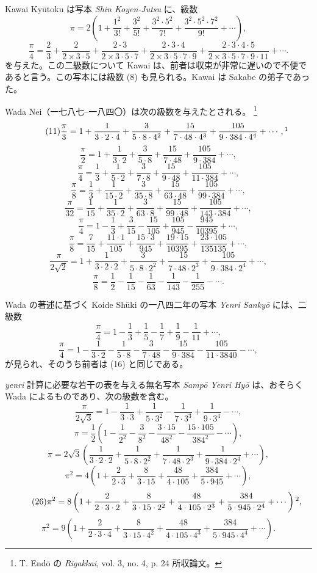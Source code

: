 \documentclass[11pt]{article}
\newcommand{\scanpage}[2]{\clearpage\setcounter{footnote}{0}\noindent{\footnotesize\color{gray}PDF #1 頁 · #2}\par\medskip}
\newcommand{\scanfooter}{}
\newcommand{\dd}{\mathbin{\cdot}}
\begin{document}
Kawai Kyūtoku は写本 \emph{Shin Koyen-Jutsu} に、級数
\[
\tag{9}\pi=2\left(1+\frac{1^2}{3!}+\frac{3^2}{5!}+\frac{3^2\dd5^2}{7!}+\frac{3^2\dd5^2\dd7^2}{9!}+\cdots\right),
\]
\[
\tag{10}\frac{\pi}{4}=\frac23+\frac2{2\times3\dd5}+\frac{2\dd3}{2\times3\dd5\dd7}+\frac{2\dd3\dd4}{2\times3\dd5\dd7\dd9}+\frac{2\dd3\dd4\dd5}{2\times3\dd5\dd7\dd9\dd11}+\cdots.
\]
を与えた。この二級数について Kawai は、前者は収束が非常に遅いので不便であると言う。この写本には級数 (8) も見られる。Kawai は Sakabe の弟子であった。

Wada Nei（一七八七--一八四〇）は次の級数を与えたとされる。
\footnote{T. Endō の \emph{Rigakkai}, vol. 3, no. 4, p. 24 所収論文。}
\[
\tag{11}\frac{\pi}{3}=1+\frac1{3\dd2\dd4}+\frac3{5\dd8\dd4^2}+\frac{15}{7\dd48\dd4^3}+\frac{105}{9\dd384\dd4^4}+\cdots,\footnotemark
\]
\[
\tag{12}\frac{\pi}{2}=1+\frac1{3\dd2}+\frac3{5\dd8}+\frac{15}{7\dd48}+\frac{105}{9\dd384}+\cdots,
\]
\[
\tag{13}\frac{\pi}{4}=\frac13+\frac1{5\dd2}+\frac3{7\dd8}+\frac{15}{9\dd48}+\frac{105}{11\dd384}+\cdots,
\]
\[
\tag{14}\frac{\pi}{8}=\frac13+\frac1{15\dd2}+\frac3{35\dd8}+\frac{15}{63\dd48}+\frac{105}{99\dd384}+\cdots,
\]
\[
\tag{15}\frac{\pi}{32}=\frac1{15}+\frac1{35\dd2}+\frac3{63\dd8}+\frac{15}{99\dd48}+\frac{105}{143\dd384}+\cdots,
\]
\[
\tag{16}\frac{\pi}{4}=1-\frac13+\frac3{15}-\frac{15}{105}+\frac{105}{945}-\frac{945}{10395}+\cdots,
\]
\[
\tag{17}\frac{\pi}{8}=\frac7{15}+\frac{11\dd1}{105}+\frac{15\dd3}{945}+\frac{19\dd15}{10395}+\frac{23\dd105}{135135}+\cdots,
\]
\[
\tag{18}\frac{\pi}{2\sqrt2}=1+\frac1{3\dd2\dd2}+\frac3{5\dd8\dd2^2}+\frac{15}{7\dd48\dd2^3}+\frac{105}{9\dd384\dd2^4}+\cdots,
\]
\[
\tag{19}\frac{\pi}{8}=\frac12-\frac1{15}-\frac1{63}-\frac1{143}-\frac1{255}-\cdots.
\]

Wada の著述に基づく Koide Shūki の一八四二年の写本 \emph{Yenri Sankyō} には、二級数
\[
\tag{20}\frac{\pi}{4}=1-\frac13+\frac15-\frac17+\frac19-\frac1{11}+\cdots,
\]
\[
\tag{21}\frac{\pi}{4}=1-\frac1{3\dd2}-\frac1{5\dd8}-\frac3{7\dd48}-\frac{15}{9\dd384}-\frac{105}{11\dd3840}-\cdots,
\]
が見られ、そのうち前者は (16) と同じである。
\scanfooter

\scanpage{0229}{第29章、印刷頁215}
\emph{yenri} 計算に必要な若干の表を与える無名写本 \emph{Sampō Yenri Hyō} は、おそらく Wada によるものであり、次の級数を含む。
\[
\tag{22}\frac{\pi}{2\sqrt3}=1-\frac1{3\dd3}+\frac1{5\dd3^2}-\frac1{7\dd3^3}+\frac1{9\dd3^4}-\cdots,
\]
\[
\tag{23}\pi=\frac12\left(1-\frac1{2^2}-\frac3{8^2}-\frac{3\dd15}{48^2}-\frac{15\dd105}{384^2}-\cdots\right),
\]
\[
\tag{24}\pi=2\sqrt3\left(\frac1{3\dd2\dd2}+\frac1{5\dd8\dd2^2}+\frac1{7\dd48\dd2^3}+\frac1{9\dd384\dd2^4}+\cdots\right),
\]
\[
\tag{25}\pi^2=4\left(1+\frac2{2\dd3}+\frac8{3\dd15}+\frac{48}{4\dd105}+\frac{384}{5\dd945}+\cdots\right),
\]
\[
\tag{26}\pi^2=8\left(1+\frac2{2\dd3\dd2}+\frac8{3\dd15\dd2^2}+\frac{48}{4\dd105\dd2^3}+\frac{384}{5\dd945\dd2^4}+\cdots\right)\text{\footnotemark},
\]
\[
\tag{27}\pi^2=9\left(1+\frac2{2\dd3\dd4}+\frac8{3\dd15\dd4^2}+\frac{48}{4\dd105\dd4^3}+\frac{384}{5\dd945\dd4^4}+\cdots\right).
\]
\end{document}
